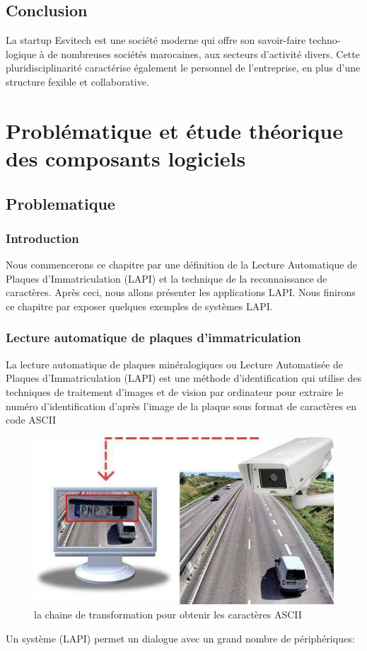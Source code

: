 \documentclass[11pt]{report}
\begin{document}
\section*{Conclusion}

La startup Esvitech est une société moderne qui offre son savoir-faire techno-
logique à de nombreuses sociétés marocaines, aux secteurs d'activité divers. Cette
pluridisciplinarité caractérise également le personnel de l'entreprise, en plus d'une
structure fexible et collaborative.

\chapter{Problématique et étude théorique des
	composants logiciels}
\section{Problematique}
\subsection{Introduction}
Nous commencerons ce chapitre par une définition de la Lecture Automatique de
Plaques d’Immatriculation (LAPI) et la technique de la reconnaissance de caractères. Après
ceci, nous allons présenter les applications LAPI. Nous finirons ce chapitre par exposer
quelques exemples de systèmes LAPI.
\subsection{Lecture automatique de plaques d’immatriculation}
La lecture automatique de plaques minéralogiques ou Lecture Automatisée de Plaques
d’Immatriculation (LAPI) est une méthode d'identification qui utilise des techniques de
traitement d'images et de vision par ordinateur pour extraire le numéro d’identification d’après
l’image de la plaque sous format de caractères en code ASCII
\begin{figure}[H]
	\begin{center}
		\includegraphics[width=12cm]{images/chaine.png}
		\caption{la chaine de transformation pour obtenir les caractères ASCII}
		\label{fig:figure}
	\end{center}
\end{figure}
Un système (LAPI) permet un dialogue avec un grand nombre de périphériques:
\end{document}
